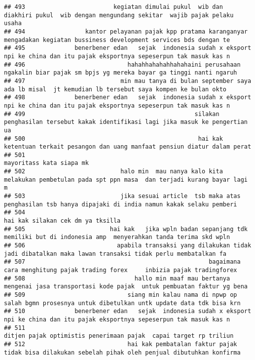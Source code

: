 \documentclass[
]{article}
\begin{document}
\begin{verbatim}
## 493                         kegiatan dimulai pukul  wib dan diakhiri pukul  wib dengan mengundang sekitar  wajib pajak pelaku usaha 
## 494                 kantor pelayanan pajak kpp pratama karanganyar mengadakan kegiatan bussiness development services bds dengan te 
## 495              benerbener edan   sejak  indonesia sudah x eksport npi ke china dan itu pajak eksportnya sepeserpun tak masuk kas n
## 496                             hahahhahahahhahahaini perusahaan ngakalin biar pajak sm bpjs yg mereka bayar ga tinggi nanti ngaruh 
## 497                           min mau tanya di bulan september saya ada lb misal  jt kemudian lb tersebut saya kompen ke bulan okto 
## 498              benerbener edan   sejak  indonesia sudah x eksport npi ke china dan itu pajak eksportnya sepeserpun tak masuk kas n
## 499                                                silakan penghasilan tersebut kakak identifikasi lagi jika masuk ke pengertian ua 
## 500                                                 hai kak  ketentuan terkait pesangon dan uang manfaat pensiun diatur dalam perat 
## 501                                                                                                        mayoritass kata siapa mk 
## 502                           halo min  mau nanya kalo kita melakukan pembetulan pada spt ppn masa  dan terjadi kurang bayar lagi m 
## 503                           jika sesuai article  tsb maka atas penghasilan tsb hanya dipajaki di india namun kakak selaku pemberi 
## 504                                                                                                hai kak silakan cek dm ya tksilla
## 505                        hai kak   jika wpln badan sepanjang tdk memiliki but di indonesia amp  menyerahkan tanda terima skd wpln 
## 506                          apabila transaksi yang dilakukan tidak jadi dibatalkan maka lawan transaksi tidak perlu membatalkan fa 
## 507                                                    bagaimana cara menghitung pajak trading forex     inbizia pajak tradingforex 
## 508                               hallo min maaf mau bertanya mengenai jasa transportasi kode pajak  untuk pembuatan faktur yg bena 
## 509                             siang min kalau nama di npwp op salah bgmn prosesnya untuk dibetulkan untk update data tdk bisa krn 
## 510              benerbener edan   sejak  indonesia sudah x eksport npi ke china dan itu pajak eksportnya sepeserpun tak masuk kas n
## 511                                                               ditjen pajak optimistis penerimaan pajak  capai target rp triliun 
## 512                             hai kak pembatalan faktur pajak tidak bisa dilakukan sebelah pihak oleh penjual dibutuhkan konfirma 

\end{verbatim}
\end{document}
